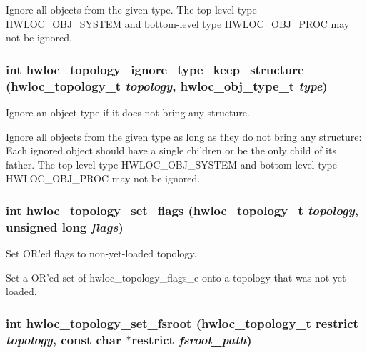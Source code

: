 Ignore all objects from the given type. The top-level type HWLOC\_\-OBJ\_\-SYSTEM and bottom-level type HWLOC\_\-OBJ\_\-PROC may not be ignored. \hypertarget{group__hwlocality__configuration_g1f987bca941d6949faf7b1554dd7bc12}{
\subsubsection[{hwloc\_\-topology\_\-ignore\_\-type\_\-keep\_\-structure}]{\setlength{\rightskip}{0pt plus 5cm}int hwloc\_\-topology\_\-ignore\_\-type\_\-keep\_\-structure ({\bf hwloc\_\-topology\_\-t} {\em topology}, \/  {\bf hwloc\_\-obj\_\-type\_\-t} {\em type})}}
\label{group__hwlocality__configuration_g1f987bca941d6949faf7b1554dd7bc12}


Ignore an object type if it does not bring any structure. 

Ignore all objects from the given type as long as they do not bring any structure: Each ignored object should have a single children or be the only child of its father. The top-level type HWLOC\_\-OBJ\_\-SYSTEM and bottom-level type HWLOC\_\-OBJ\_\-PROC may not be ignored. \hypertarget{group__hwlocality__configuration_gaeed4df656979e5f16befea9d29b814b}{
\subsubsection[{hwloc\_\-topology\_\-set\_\-flags}]{\setlength{\rightskip}{0pt plus 5cm}int hwloc\_\-topology\_\-set\_\-flags ({\bf hwloc\_\-topology\_\-t} {\em topology}, \/  unsigned long {\em flags})}}
\label{group__hwlocality__configuration_gaeed4df656979e5f16befea9d29b814b}


Set OR'ed flags to non-yet-loaded topology. 

Set a OR'ed set of hwloc\_\-topology\_\-flags\_\-e onto a topology that was not yet loaded. \hypertarget{group__hwlocality__configuration_g45a6b5dd59be36879a64a7f73e0363c2}{
\subsubsection[{hwloc\_\-topology\_\-set\_\-fsroot}]{\setlength{\rightskip}{0pt plus 5cm}int hwloc\_\-topology\_\-set\_\-fsroot ({\bf hwloc\_\-topology\_\-t} restrict {\em topology}, \/  const char $\ast$restrict {\em fsroot\_\-path})}}
\label{group__hwlocality__configuration_g45a6b5dd59be36879a64a7f73e0363c2}


